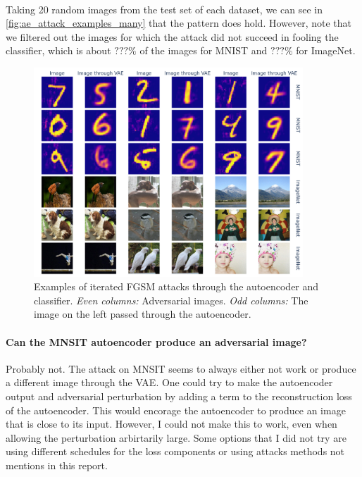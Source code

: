 \documentclass[]{scrarticle}
\begin{document}
\paragraph{}
Taking 20 random images from the test set of each dataset,
we can see in \autoref{fig:ae_attack_examples_many} that the pattern
does hold. However, note that we filtered out the images for which
the attack did not succeed in fooling the classifier, which is about
$??? \%$ of the images for MNIST and $??? \%$ for ImageNet.

\begin{figure}[h]
  \centering
  \includegraphics[width=0.9\textwidth]{images/ae_many_attack_examples.png}
  \caption{
    Examples of iterated FGSM attacks through the autoencoder and classifier.
    \emph{Even columns:} Adversarial images.
    \emph{Odd columns:} The image on the left passed through the autoencoder.
  }
  \label{fig:ae_attack_examples_many}
\end{figure}

\paragraph{Can the MNSIT autoencoder produce an adversarial image?}
Probably not.
The attack on MNSIT seems to always either not work or produce
a different image through the VAE. One could try to make the autoencoder
output and adversarial perturbation by adding a term to the reconstruction
loss of the autoencoder. This would encorage the autoencoder to produce
an image that is close to its input.
However, I could not make this to work, even when allowing the perturbation
arbirtarily large. Some options that I did not try are using different schedules for
the loss components or using attacks methods not mentions in this report.
\end{document}

